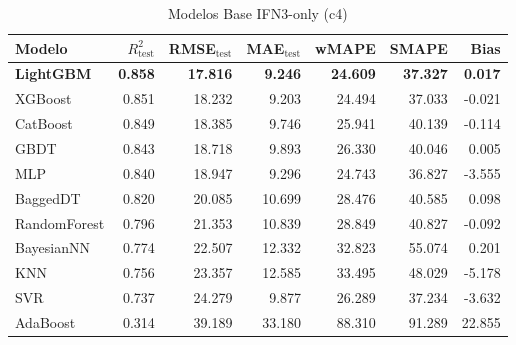 \begin{table}[H]
    \centering
    \caption{Modelos Base IFN3-only (c4)}
    \label{tab:base_ifn3_c4}
    \begin{tabular}{lrrrrrr}
        \toprule
        Modelo & $R^2_{\text{test}}$ & RMSE$_{\text{test}}$ & MAE$_{\text{test}}$ & wMAPE & SMAPE & Bias \\
        \midrule
        \textbf{LightGBM} & \textbf{0.858} & \textbf{17.816} & \textbf{9.246} & \textbf{24.609} & \textbf{37.327} & \textbf{0.017} \\
        XGBoost & 0.851 & 18.232 & 9.203 & 24.494 & 37.033 & -0.021 \\
        CatBoost & 0.849 & 18.385 & 9.746 & 25.941 & 40.139 & -0.114 \\
        GBDT & 0.843 & 18.718 & 9.893 & 26.330 & 40.046 & 0.005 \\
        MLP & 0.840 & 18.947 & 9.296 & 24.743 & 36.827 & -3.555 \\
        BaggedDT & 0.820 & 20.085 & 10.699 & 28.476 & 40.585 & 0.098 \\
        RandomForest & 0.796 & 21.353 & 10.839 & 28.849 & 40.827 & -0.092 \\
        BayesianNN & 0.774 & 22.507 & 12.332 & 32.823 & 55.074 & 0.201 \\
        KNN & 0.756 & 23.357 & 12.585 & 33.495 & 48.029 & -5.178 \\
        SVR & 0.737 & 24.279 & 9.877 & 26.289 & 37.234 & -3.632 \\
        AdaBoost & 0.314 & 39.189 & 33.180 & 88.310 & 91.289 & 22.855 \\
        \bottomrule
    \end{tabular}
\end{table}

